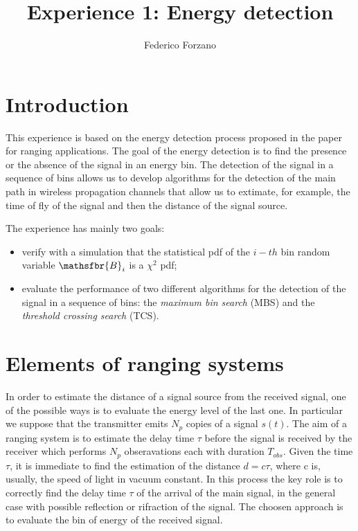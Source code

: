 \documentclass[%
    twoside, 
    a4paper
    ]{article}
\title{Experience 1: Energy detection}
\author{Federico Forzano}
\date{}
\DeclareRobustCommand{\msf}[1]{%
  \ifcat\noexpand#1\relax\msfgreek{#1}\else\mathsfbr{#1}\fi%
}
\begin{document}
\maketitle

\section{Introduction}
  This experience is based on the energy detection process proposed in the paper \cite{BarDaiConWin:J15} for
  ranging applications. 
  The goal of the energy detection is to find the presence or the absence of the signal in an energy bin. The
  detection of the signal in a sequence of bins allows us to develop algorithms for the detection of the main path
  in wireless propagation channels that allow us to extimate, for example, the time of fly of the signal and 
  then the distance of the signal source.

  The experience has mainly two goals:
  \begin{itemize}
    \item verify with a simulation that the statistical pdf of the $i-th$ bin random variable 
    $\msf{B}_i$ is a $\chi^2$ pdf;
    \item evaluate the performance of two different algorithms for the detection of the signal in a sequence
          of bins: the \emph{maximum bin search} (MBS) and the \emph{threshold crossing search} (TCS).
  \end{itemize}
  
\section{Elements of ranging systems}
  In order to estimate the distance of a signal source from the received signal, one of the possible ways is to evaluate
  the energy level of the last one. 
  In particular we suppose that the transmitter emits $N_p$ copies of a signal $s(t)$. The aim of a ranging 
  system is to estimate the delay time $\tau$ before the signal is received by the receiver which performs 
  $N_p$ obseravations each with duration $T_{obs}$. Given the time $\tau$, it is immediate to find the estimation
  of the distance $d = c \tau$, where c is, usually, the speed of light in vacuum constant.
  In this process the key role is to correctly find the delay time $\tau$ of the arrival of the main signal,
  in the general case with possible reflection or rifraction of the signal. The choosen approach is to evaluate
  the bin of energy of the received signal.
  
\end{document}
